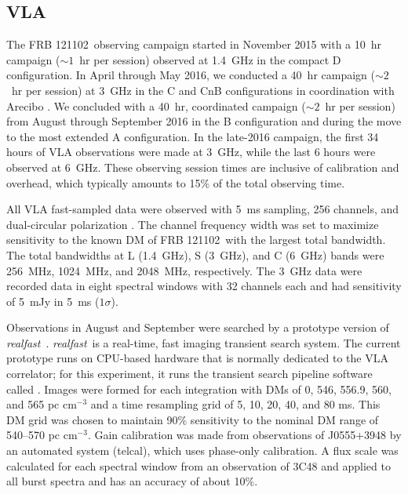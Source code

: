 \documentclass[twocolumn]{aastex61}
\newcommand{\rf}{\emph{realfast}}
\newcommand{\frb}{FRB 121102}
\begin{document}
\subsection{VLA}

The \frb\ observing campaign started in November 2015 with a 10~hr campaign ($\sim1$~hr per session) observed at 1.4~GHz in the compact D configuration. In April through May 2016, we conducted a 40~hr campaign ($\sim2$~hr per session) at 3~GHz in the C and CnB configurations in coordination with Arecibo \citep{2016arXiv160308880S}. We concluded with a 40~hr, coordinated campaign ($\sim2$~hr per session) from August through September 2016 in the B configuration and during the move to the most extended A configuration. In the late-2016 campaign, the first 34 hours of VLA observations were made at 3~GHz, while the last 6 hours were observed at 6~GHz. These observing session times are inclusive of calibration and overhead, which typically amounts to 15\% of the total observing time.

All VLA fast-sampled data were observed with 5~ms sampling, 256 channels, and dual-circular polarization \citep{2015ApJ...807...16L}. The channel frequency width was set to maximize sensitivity to the known DM of \frb\ with the largest total bandwidth. The total bandwidths at L (1.4~GHz), S (3~GHz), and C (6~GHz) bands were 256~MHz, 1024~MHz, and 2048~MHz, respectively. The 3~GHz data were recorded data in eight spectral windows with 32 channels each and had sensitivity of 5~mJy in 5~ms ($1\sigma$).

Observations in August and September were searched by a prototype version of \rf\ \citep[see \url{http://realfast.io};][]{2017AAS...22933002L}. \rf\ is a real-time, fast imaging transient search system. The current prototype runs on CPU-based hardware that is normally dedicated to the VLA correlator; for this experiment, it runs the transient search pipeline software called . Images were formed for each integration with DMs of 0, 546, 556.9, 560, and 565 pc cm$^{-3}$ and a time resampling grid of 5, 10, 20, 40, and 80 ms. This DM grid was chosen to maintain 90\% sensitivity to the nominal DM range of 540--570 pc cm$^{-3}$. Gain calibration was made from observations of J0555+3948 by an automated system (telcal), which uses phase-only calibration. A flux scale was calculated for each spectral window from an observation of 3C48 and applied to all burst spectra and has an accuracy of about 10\%.
\end{document}
